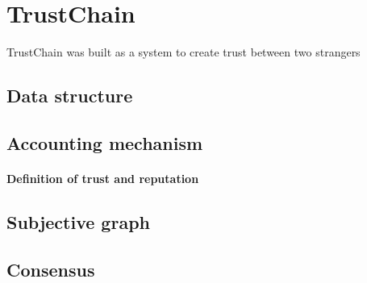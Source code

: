 \section{TrustChain}
TrustChain was built as a system to create trust between two strangers

\subsection{Data structure}
\subsection{Accounting mechanism}
\paragraph{Definition of trust and reputation}
\subsection{Subjective graph}
\subsection{Consensus}

